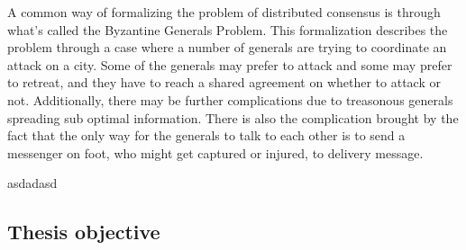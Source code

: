\vspace{1em}

A common way of formalizing the problem of distributed consensus is through what's called the Byzantine Generals Problem. This formalization describes the problem through a case where a number of generals are trying to coordinate an attack on a city. Some of the generals may prefer to attack and some may prefer to retreat, and they have to reach a shared agreement on whether to attack or not. Additionally, there may be further complications due to treasonous generals spreading sub optimal information. There is also the complication brought by the fact that the only way for the generals to talk to each other is to send a messenger on foot, who might get captured or injured, to delivery message.  \cite{Lamport_Byzantine_1982}

asdadasd
\clearpage

\subsection{Thesis objective}


\subsection{}
\clearpage